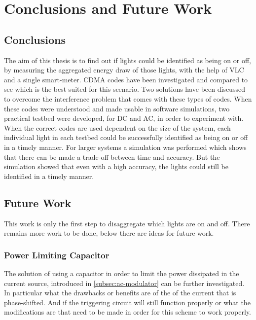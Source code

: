 
\chapter{Conclusions and Future Work}
\label{chp:conclusionsandfuturework}

	\section{Conclusions}


	The aim of this thesis is to find out if lights could be identified as being on or off, by measuring the aggregated energy draw of those lights, with the help of VLC and a single smart-meter.
	CDMA codes have been investigated and compared to see which is the best suited for this scenario.
	Two solutions have been discussed to overcome the interference problem that comes with these types of codes.
	When these codes were understood and made usable in software simulations, two practical testbed were developed, for DC and AC, in order to experiment with.
	When the correct codes are used dependent on the size of the system, each individual light in each testbed could be successfully identified as being on or off in a timely manner.
	For larger systems a simulation was performed which shows that there can be made a trade-off between time and accuracy. 
	But the simulation showed that even with a high accuracy, the lights could still be identified in a timely manner.






\section{Future Work}


This work is only the first step to disaggregate which lights are on and off.
There remains more work to be done, below there are ideas for future work.

	\subsection{Power Limiting Capacitor}

	The solution of using a capacitor in order to limit the power dissipated in the current source, introduced in \autoref{subsec:ac-modulator} can be further investigated.
	In particular what the drawbacks or benefits are of the of the current that is phase-shifted.
	And if the triggering circuit will still function properly or what the modifications are that need to be made in order for this scheme to work properly.


